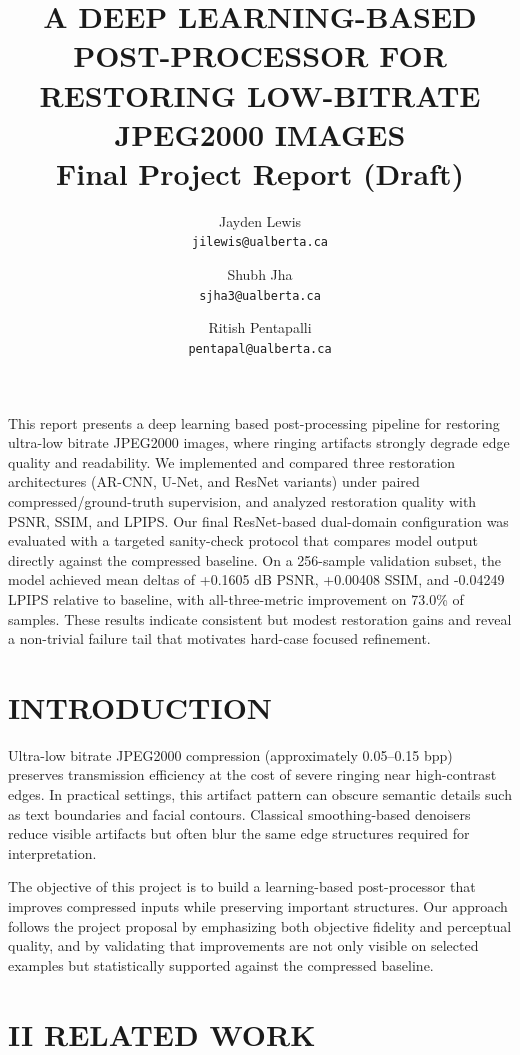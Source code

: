 \documentclass[12pt]{article}
\title{\large A DEEP LEARNING-BASED POST-PROCESSOR FOR RESTORING LOW-BITRATE JPEG2000 IMAGES\\[2mm]
\normalsize Final Project Report (Draft)}
\author{
    Jayden Lewis \\
    \small \texttt{jilewis@ualberta.ca}
    \and
    Shubh Jha \\
    \small \texttt{sjha3@ualberta.ca}
    \and
    Ritish Pentapalli \\
    \small \texttt{pentapal@ualberta.ca}
}
\date{}
\renewenvironment{abstract}
 {\begin{center}
  \bfseries \abstractname\vspace{-.5em}\vspace{0pt}
  \end{center}
  \list{}{
    \listparindent 0.5cm
    \itemindent    \listparindent
    \leftmargin    0pt
    \rightmargin   \leftmargin
    \parsep        0pt
  }
  \item\relax}
 {\endlist}
\begin{document}
\maketitle

\begin{abstract}
This report presents a deep learning based post-processing pipeline for restoring ultra-low bitrate JPEG2000 images, where ringing artifacts strongly degrade edge quality and readability. We implemented and compared three restoration architectures (AR-CNN, U-Net, and ResNet variants) under paired compressed/ground-truth supervision, and analyzed restoration quality with PSNR, SSIM, and LPIPS. Our final ResNet-based dual-domain configuration was evaluated with a targeted sanity-check protocol that compares model output directly against the compressed baseline. On a 256-sample validation subset, the model achieved mean deltas of +0.1605 dB PSNR, +0.00408 SSIM, and -0.04249 LPIPS relative to baseline, with all-three-metric improvement on 73.0\% of samples. These results indicate consistent but modest restoration gains and reveal a non-trivial failure tail that motivates hard-case focused refinement.
\end{abstract}

\section*{{\large I}\small{NTRODUCTION}}

Ultra-low bitrate JPEG2000 compression (approximately 0.05--0.15 bpp) preserves transmission efficiency at the cost of severe ringing near high-contrast edges. In practical settings, this artifact pattern can obscure semantic details such as text boundaries and facial contours. Classical smoothing-based denoisers reduce visible artifacts but often blur the same edge structures required for interpretation.

The objective of this project is to build a learning-based post-processor that improves compressed inputs while preserving important structures. Our approach follows the project proposal by emphasizing both objective fidelity and perceptual quality, and by validating that improvements are not only visible on selected examples but statistically supported against the compressed baseline.

\section*{{\large II}\small{ RELATED WORK}}
\end{document}
